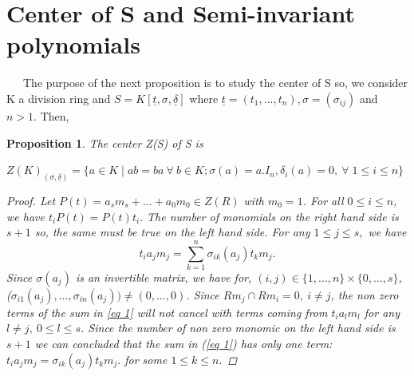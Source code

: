 \documentclass[12pt,a4paper]{article}
\newtheorem{proposition}[theorem]{Proposition}
\newcommand{\si}{\sigma}
\newcommand{\ut}{\underline{t}}
\newcommand{\ud}{\underline{\delta}}
\begin{document}
	\section{Center of S and Semi-invariant polynomials}
	 ~~~The purpose of the next proposition is to study the center of S so, we consider K a division ring and $ S = K[\ut, \sigma, \ud] $ where $ \ut = (t_{1}, ..., t_{n}) , \sigma = (\sigma_{ij})$ and $ n > 1. $ Then, 
	\begin{proposition}
		\label{Pro for the center of $S$}
		 The center Z(S) of S is 
		\begin{center}
			 $Z(K)_{(\sigma, \ud)} = \{a \in K \mid ab = ba~ \forall~ b \in K ; \si(a) = a. I_{n} , \delta_i (a) = 0, ~ \forall \; 1\le i \le n\}$  
		\end{center} 
	\begin{proof} 
Let $P(t) = a_s m_s + ... + a_0m_0 \in Z(R)$ with $m_0 = 1$.  For all $0 \leq i \leq n$, we have $t_i P(t) = P(t) t_i. $ The number of monomials on the right hand side is $ s + 1 $ so, the same must be true on the left hand side. For any $ 1 \leq j \leq s, $ we have 
\begin{equation} \label{eq 1}
	t_i a_j m_j = \sum_{k=1}^{n} \sigma_{ik}(a_j) t_k m_j. 
\end{equation} 
Since $\sigma(a_j)$ is an invertible matrix, we have for, $(i,j) \in \{1,\dots, n\} \times \{ 0,\dots, s\}$, ($\sigma_{i1}(a_j),\dots ,\sigma_{in}(a_j))\ne (0,\dots,0)$.
Since $R m_j \cap  Rm_i=0, ~ i \neq j $, the non zero terms of the sum in \ref{eq 1} will not cancel with terms coming from $t_i a_l m_l $ for any $l \neq j,~ 0 \leq l \leq s$. Since the number of non zero monomic on the left hand side is $s + 1$ we can concluded that the  sum in (\ref{eq 1}) has only one term: 
$t_i a_j m_j = \sigma_{ik} (a_j) t_k m_j. $ for some $1 \leq k \leq n.$  


\end{proof}
\end{proposition}
\end{document}
